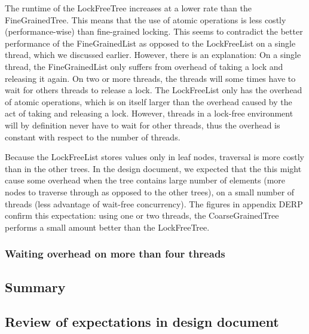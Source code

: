 \documentclass[a4paper]{article}
\begin{document}
The runtime of the LockFreeTree increases at a lower rate than the
FineGrainedTree. This means that the use of atomic operations is less costly
(performance-wise) than fine-grained locking. This seems to contradict the
better performance of the FineGrainedList as opposed to the LockFreeList on a
single thread, which we discussed earlier. However, there is an explanation:
On a single thread, the FineGrainedList only suffers from overhead of taking a
lock and releasing it again. On two or more threads, the threads will
some times have to wait for others threads to release a lock. The LockFreeList
only has the overhead of atomic operations, which is on itself larger than the
overhead caused by the act of taking and releasing a lock. However, threads in
a lock-free environment will by definition never have to wait for other
threads, thus the overhead is constant with respect to the number of threads.

Because the LockFreeList stores values only in leaf nodes, traversal is more
costly than in the other trees. In the design document, we expected that the
this might cause some overhead when the tree contains large number of elements
(more nodes to traverse through as opposed to the other trees), on a small
number of threads (less advantage of wait-free concurrency). The figures in
appendix DERP confirm this expectation: using one or two threads, the
CoarseGrainedTree performs a small amount better than the LockFreeTree.

\subsubsection{Waiting overhead on more than four threads}


\subsection{Summary}


\subsection{Review of expectations in design document}

\end{document}
